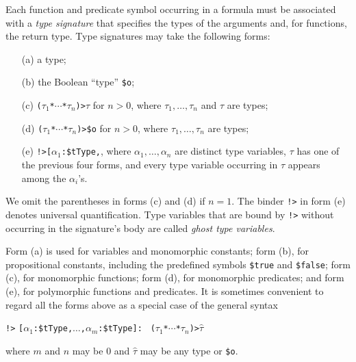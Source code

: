 Each function and predicate symbol occurring in a formula must be associated
with a {\em type signature\/} that specifies the types of the arguments and, for
functions, the return type. Type signatures may take the following forms:
%
\begin{enumerate}
\item[(a)] a type;
\item[(b)] the Boolean ``type'' {\tt \$o}; %
\item[(c)] {\tt ($\tau_1$\;*\;${\cdots}$\;*\;$\tau_n$)\;>\;$\tau$} for $n > 0$,
where $\tau_1,\dots,\tau_n$ and $\tau$ are types;
\item[(d)] {\tt ($\tau_1$\;*\;${\cdots}$\;*\;$\tau_n$)\;>\;\$o} for $n > 0$,
where $\tau_1,\dots,\tau_n$ are types;
\item[(e)] {\tt !>\;[$\alpha_1$\::\:\$tType,}\;{\tt ${\dots}$,}\;{\tt
$\alpha_n$\::\:\$tType]:\;$\tau$}, where $\alpha_1,\dots,\alpha_n$ are distinct
type variables, $\tau$ has one of the previous four forms, and every type
variable occurring in $\tau$ appears among the $\alpha_i$'s.
\end{enumerate}
%
We omit the parentheses in forms (c) and (d) if $n = 1$. The binder {\tt !>} in
form (e) denotes %
universal quantification. Type variables that are bound by {\tt !>} without
occurring in the signature's body are called \emph{ghost type variables}.

Form (a) is used for variables and monomorphic constants; form (b), for
propositional constants, including the predefined symbols {\tt \$true} and
{\tt \$false}; form (c), for monomorphic functions; form (d), for monomorphic
predicates; and form (e), for polymorphic functions and predicates.
It is sometimes convenient to regard all the forms above as a special case of
the general syntax
\begin{center}
{\tt !>} {\tt [$\alpha_1$\;:\;\$tType,\;${\dots}$,\;$\alpha_m$\;:\;\$tType]:} {\tt
($\tau_1$\;*\;${\cdots}$\;*\;$\tau_n$)\;>\;$\widehat \tau$}
\end{center}
where $m$ and $n$ may be 0 and $\widehat \tau$ may be any type or {\tt \$o}.


